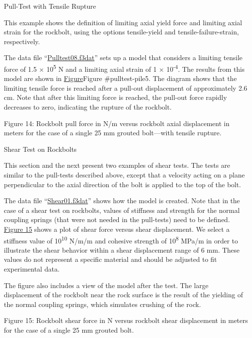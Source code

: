 \documentclass[a4paper, nobind]{templates/ociamthesis}
\begin{document}
Pull-Test with Tensile
Rupture

This example shows the definition of limiting axial yield force and
limiting
axial strain for the rockbolt, using the options tensile-yield and
tensile-failure-strain, respectively.

The data file ``\protect\hyperlink{pulltest08data}{Pulltest08.f3dat}'' sets up a model that
considers a limiting tensile force of 1.5 × 10\textsuperscript{5} N and a limiting
axial strain of 1 × 10\textsuperscript{-4}. The results from this model are shown in
\href{.html\#pulltest-pile5}{Figure}Figure \#pulltest-pile5. The diagram
shows that the limiting
tensile force is reached after a pull-out displacement of approximately
2.6 cm.
Note that after this limiting force is reached, the pull-out force
rapidly
decreases to zero, indicating the rupture of the rockbolt.

Figure 14: Rockbolt pull force in N/m versus rockbolt axial
displacement in meters for the case of a single 25 mm grouted
bolt---with tensile
rupture.

Shear Test on Rockbolts

This section and the next present two examples of shear tests. The tests
are
similar to the pull-tests described above, except that a velocity acting
on a
plane perpendicular to the axial direction of the bolt is applied to the
top of
the bolt.

The data file ``\protect\hyperlink{pulltestshear01data}{Shear01.f3dat}'' shows how the
model
is created. Note that in the case of a shear test on rockbolts, values
of
stiffness and strength for the normal coupling springs (that were not
needed in
the pull-tests) need to be defined. \protect\hyperlink{pulltest-shear1}{Figure 15}
shows a plot of shear force versus shear displacement. We select a
stiffness
value of 10\textsuperscript{10} N/m/m and cohesive strength of 10\textsuperscript{8} MPa/m in
order to illustrate the shear behavior within a shear displacement range
of 6
mm. These values do not represent a specific material and should be
adjusted to
fit experimental data.

The figure also includes a view of the model after the test. The large
displacement of the rockbolt near the rock surface is the result of the
yielding
of the normal coupling springs, which simulates crushing of the rock.

Figure 15: Rockbolt shear force in N versus rockbolt shear
displacement in meters for the case of a single 25 mm grouted bolt.
\end{document}
